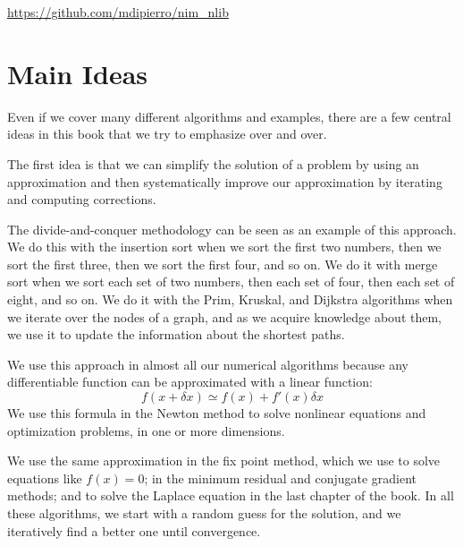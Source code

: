 \documentclass[justified, sixbynine]{tufte-book}
\theoremstyle{plain}%
\newtheorem * {corollary}{Corollary}
\theoremstyle{definition}
\theoremstyle{remark}
\newtheorem * {remark}{Remark}
\newtheorem * {note}{Note}
\begin{document}
\begin{fullwidth}
\url{https://github.com/mdipierro/nim_nlib}

\section{Main Ideas}

Even if we cover many different algorithms and examples, there are a few central ideas in this book that we try to emphasize over and over.

The first idea is that we can simplify the solution of a problem by using an approximation and then systematically improve our approximation by iterating and computing corrections.

The divide-and-conquer methodology can be seen as an example of this approach. We do this with the insertion sort when we sort the first two numbers, then we sort the first three, then we sort the first four, and so on. We do it with merge sort when we sort each set of two numbers, then each set of four, then each set of eight, and so on. We do it with the Prim, Kruskal, and Dijkstra algorithms when we iterate over the nodes of a graph, and as we acquire knowledge about them, we use it to update the information about the shortest paths.

We use this approach in almost all our numerical algorithms because any differentiable function can be approximated with a linear function:
\begin{equation}
f(x+\delta x) \simeq f(x) + f'(x)\delta x
\end{equation}
We use this formula in the Newton method to solve nonlinear equations and optimization problems, in one or more dimensions.

We use the same approximation in the fix point method, which we use to solve equations like $f(x)=0$; in the minimum residual and conjugate gradient methods; and to solve the Laplace equation in the last chapter of the book. In all these algorithms, we start with a random guess for the solution, and we iteratively find a better one until convergence.


\end{fullwidth}
\end{document}
